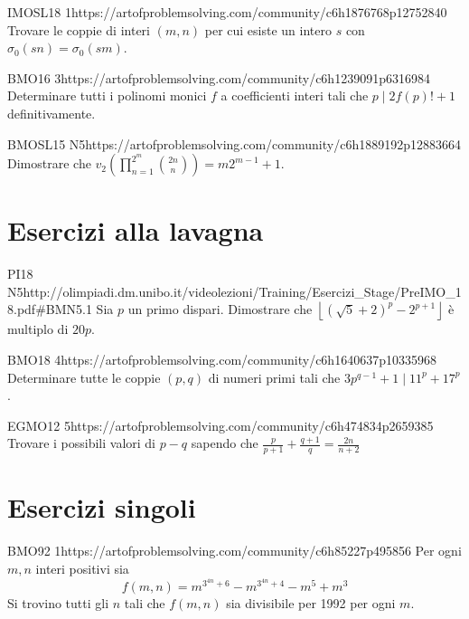 \documentclass[12pt]{article}
\begin{document}
\begin{esercizio}{IMOSL18 1}{https://artofproblemsolving.com/community/c6h1876768p12752840}
    Trovare le coppie di interi $(m,n)$ per cui esiste un intero $s$ con $\sigma_0(sn)=\sigma_0(sm)$.
\end{esercizio}

\begin{esercizio}{BMO16 3}{https://artofproblemsolving.com/community/c6h1239091p6316984}
    Determinare tutti i polinomi monici $f$ a coefficienti interi tali che $p\mid 2f(p)!+1$ definitivamente.
\end{esercizio}

\begin{esercizio}{BMOSL15 N5}{https://artofproblemsolving.com/community/c6h1889192p12883664}
    Dimostrare che $v_2\left(\prod_{n=1}^{2^m}\binom{2n}{n}\right)=m2^{m-1}+1$.
\end{esercizio}


\section{Esercizi alla lavagna}

\begin{esercizio}{PI18 N5}{http://olimpiadi.dm.unibo.it/videolezioni/Training/Esercizi_Stage/PreIMO_18.pdf\#BMN5.1}
    Sia $p$ un primo dispari. Dimostrare che $\left\lfloor (\sqrt5+2)^p-2^{p+1} \right\rfloor$ è multiplo di $20p$.
\end{esercizio}

\begin{esercizio}{BMO18 4}{https://artofproblemsolving.com/community/c6h1640637p10335968}
    Determinare tutte le coppie $(p,q)$ di numeri primi tali che $3p^{q-1}+1\mid11^p+17^p$.
\end{esercizio}

\begin{esercizio}{EGMO12 5}{https://artofproblemsolving.com/community/c6h474834p2659385}
    Trovare i possibili valori di $p-q$ sapendo che $\frac{p}{p+1}+\frac{q+1}{q}=\frac{2n}{n+2}$
\end{esercizio}

\section{Esercizi singoli}

\begin{esercizio}{BMO92 1}{https://artofproblemsolving.com/community/c6h85227p495856}
Per ogni $m,n$ interi positivi sia
\[f(m,n)=m^{3^{4n}+6}-m^{3^{4n}+4}-m^{5}+m^{3}\]
Si trovino tutti gli $n$ tali che $f(m,n)$ sia divisibile per 1992 per ogni $m$.
\end{esercizio}
\end{document}
